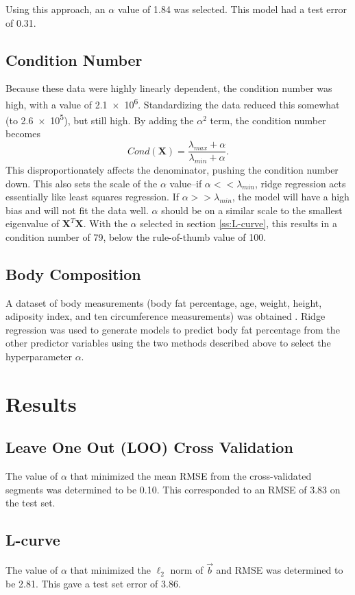 \documentclass{IEEEtran}
\begin{document}
Using this approach, an $\alpha$ value of \num{1.84} was selected. This model had a test error of \num{0.31}.

\subsection{Condition Number}
Because these data were highly linearly dependent, the condition number was high, with a value of 
\num{2.1e6}. Standardizing the data reduced this somewhat (to \num{2.6e5}), but still high. By adding the 
$\alpha^2$ term, the condition number becomes $$ Cond(\mathbf{X} ) = \frac{\lambda_{max} + \alpha}
{\lambda_{min} + \alpha}. $$ This disproportionately affects the denominator, pushing the condition number 
down. This also sets the scale of the $\alpha$ value--if $\alpha << \lambda_{min}$, ridge regression acts 
essentially like least squares regression. If $\alpha >> \lambda_{min}$, the model will have a high bias 
and will not fit the data well. $\alpha$ should be on a similar scale to the smallest eigenvalue of 
$\mathbf{X}^T \mathbf{X}$. With the $\alpha$ selected in section \ref{ss:L-curve}, this results in a 
condition number of \num{79}, below the rule-of-thumb value of \num{100}.

\subsection{Body Composition}
A dataset of body measurements (body fat percentage, age, weight, height, adiposity index, and ten 
circumference measurements) was obtained \cite{Penrose1985}. Ridge regression was used to generate models to 
predict body fat percentage from the other predictor variables using the two methods described above to select 
the hyperparameter $\alpha$.

\section{Results}

\subsection{Leave One Out (LOO) Cross Validation}
The value of $\alpha$ that minimized the mean RMSE from the cross-validated segments was determined to be 
\num{0.10}. This corresponded to an RMSE of \num{3.83} on the test set.

\subsection{L-curve} \label{ss:Results L-Curve}
The value of $\alpha$ that minimized the $\ell_2$ norm of $\vec{b}$ and RMSE was determined to be \num{2.81}. 
This gave a test set error of \num{3.86}.
\end{document}
